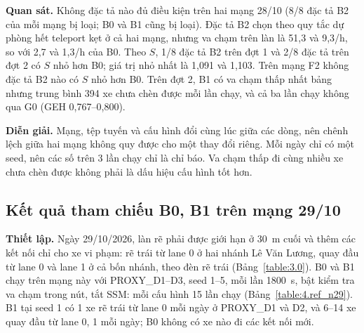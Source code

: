 \documentclass[../main.tex]{subfiles}
\begin{document}
\textbf{Quan sát.} Không đặc tả nào đủ điều kiện trên hai mạng 28/10 (8/8 đặc tả B2 của mỗi mạng bị loại; B0 và B1 cũng bị loại). Đặc tả B2 chọn theo quy tắc dự phòng hết teleport kẹt ở cả hai mạng, nhưng va chạm trên làn là 51,3 và 9,3/h, so với 2,7 và 1,3/h của B0. Theo $S$, 1/8 đặc tả B2 trên đợt 1 và 2/8 đặc tả trên đợt 2 có $S$ nhỏ hơn B0; giá trị nhỏ nhất là 1,091 và 1,103. Trên mạng F2 không đặc tả B2 nào có $S$ nhỏ hơn B0. Trên đợt 2, B1 có va chạm thấp nhất bảng nhưng trung bình 394 xe chưa chèn được mỗi lần chạy, và cả ba lần chạy không qua G0 (GEH 0,767--0,800).

\textbf{Diễn giải.} Mạng, tệp tuyến và cấu hình đổi cùng lúc giữa các dòng, nên chênh lệch giữa hai mạng không quy được cho một thay đổi riêng. Mỗi ngày chỉ có một seed, nên các số trên 3 lần chạy chỉ là chỉ báo. Va chạm thấp đi cùng nhiều xe chưa chèn được không phải là dấu hiệu cấu hình tốt hơn.

\subsection{Kết quả tham chiếu B0, B1 trên mạng 29/10}
\label{subsection:ref_n29}

\textbf{Thiết lập.} Ngày 29/10/2026, làn rẽ phải được giới hạn ở 30~m cuối và thêm các kết nối chỉ cho xe vi phạm: rẽ trái từ lane 0 ở hai nhánh Lê Văn Lương, quay đầu từ lane 0 và lane 1 ở cả bốn nhánh, theo đèn rẽ trái (Bảng~\ref{table:3.0}). B0 và B1 chạy trên mạng này với PROXY\_D1--D3, seed 1--5, mỗi lần 1800~s, bật kiểm tra va chạm trong nút, tắt SSM: mỗi cấu hình 15 lần chạy (Bảng~\ref{table:4.ref_n29}). B1 tại seed 1 có 1 xe rẽ trái từ lane 0 mỗi ngày ở PROXY\_D1 và D2, và 6--14 xe quay đầu từ lane 0, 1 mỗi ngày; B0 không có xe nào đi các kết nối mới.
\end{document}
